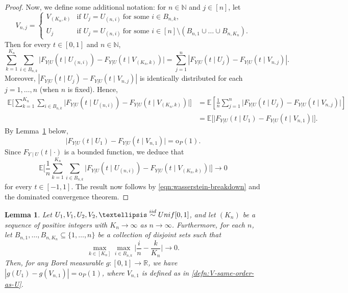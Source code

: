 \documentclass[12pt]{article}
\newtheorem{lemma}[theorem]{Lemma}
\newcommand{\R}{\mathbb{R}}
\newcommand{\EE}[1]{\mathbb{E}\left[{#1}\right]}
\newcommand{\iidsim}{\stackrel{\textnormal{iid}}{\sim}}
\begin{document}
\begin{proof}
Now, we define some additional notation: for $n\in \mathbb{N}$ and $j\in [n]$, let
\begin{equation}\label{defn:V-same-order-as-U}
    V_{n,j}=\begin{cases}
       V_{(K_n,k)} & \text{if } U_j = U_{(n,i)}~\text{for some } i\in B_{n,k},\\
       U_j & \text{if } U_j = U_{(n,i)}~\text{for some } i\in[n] \setminus (B_{n,1}\cup\dots\cup B_{n,K_n}).
    \end{cases}
\end{equation}
Then for every $t \in [0,1]$ and $n \in \mathbb{N}$, 
\[
\sum_{k=1}^{K_n} \sum_{i\in B_{n,k}} \bigl|F_{Y|U}(t\mid U_{(n,i)}) - F_{Y|U}(t\mid V_{(K_n,k)})\bigr| = \sum_{j=1}^n |F_{Y|U}(t\mid U_j) - F_{Y|U}(t\mid V_{n,j})|.
\]
Moreover, $|F_{Y|U}(t\mid U_j) - F_{Y|U}(t\mid V_{n,j})|$ is identically distributed for each $j=1,\dots,n$ (when $n$ is fixed). Hence, 
\begin{align*}
    \mathbb{E}\Biggl[\sum_{k=1}^{K_n} \sum_{i\in B_{n,k}} \bigl|F_{Y|U}(t\mid U_{(n,i)}) - F_{Y|U}(t\mid V_{(K_n,k)})\bigr|\Biggr]&=\EE{\frac{1}{n}\sum_{j=1}^n \bigl|F_{Y|U}(t\mid U_j) - F_{Y|U}(t\mid V_{n,j})\bigr|}\\ &= \mathbb{E}\bigl[\bigl|F_{Y|U}(t\mid U_1) - F_{Y|U}(t\mid V_{n,1})\bigr|\bigr].
\end{align*}
By Lemma~\ref{lem:chatterjee_lemma_extension} below,
\[
\bigl|F_{Y|U}(t\mid U_{1}) - F_{Y|U}(t\mid V_{n,1})\bigr| = \mathrm{o}_P(1).
\]
Since $F_{Y\mid U}(t\mid \cdot)$ is a bounded function, we deduce that
\[
\mathbb{E}\Biggl[\frac{1}{n}\sum_{k=1}^{K_n}\sum_{i\in B_{n,k}}\bigl|F_{Y|U}(t\mid U_{(n,i)}) - F_{Y|U}(t\mid V_{(K_n,k)})\bigr|\Biggr] \to 0
\]
for every $t \in [-1,1]$.  The result now follows by \eqref{eqn:wasserstein-breakdown} and the dominated convergence theorem.
\end{proof}

\begin{lemma}\label{lem:chatterjee_lemma_extension}
 Let $U_1,V_1,U_2,V_2,\dots\iidsim\textnormal{Unif}[0,1]$, and let $(K_n)$ be a sequence of positive integers with $K_n\to\infty$ as $n\to\infty$. Furthermore, for each $n$, let $B_{n,1},\dots,B_{n,K_n}\subseteq \{1,\dots,n\}$ be a collection of disjoint sets such that 
\[
\max_{k \in [K_n]} \max_{i\in B_{n,k}} \biggl|\frac{i}{n} - \frac{k}{K_n}\biggr| \to 0.
\]
Then, for any Borel measurable $g:[0,1]\to\R$, we have $|g(U_1) - g(V_{n,1})| = \mathrm{o}_P(1)$,
where $V_{n,1}$ is defined as in \eqref{defn:V-same-order-as-U}.
\end{lemma}
\end{document}

